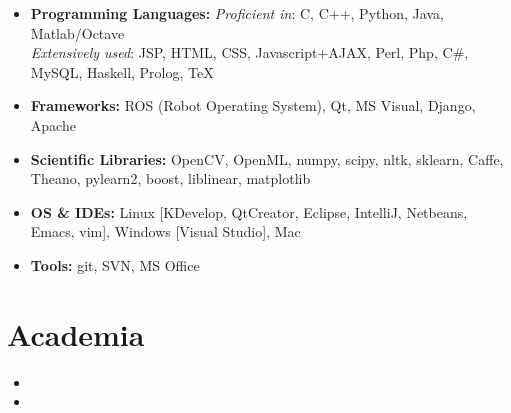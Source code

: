 \documentclass[10pt,letterpaper,sans]{moderncv}        %
\begin{document}
\vspace{2pt}

\begin{itemize}

\item \textbf{Programming Languages:} \emph{Proficient in}: C, C++, Python, Java, Matlab/Octave \\ \emph{Extensively used}: JSP, HTML, CSS, Javascript+AJAX, Perl, Php, C\#, MySQL, Haskell, Prolog, TeX

\item \textbf{Frameworks:} ROS (Robot Operating System), Qt, MS Visual, Django, Apache

\item \textbf{Scientific Libraries:} OpenCV, OpenML, numpy, scipy, nltk, sklearn, Caffe, Theano, pylearn2, boost, liblinear, matplotlib

\item \textbf{OS \& IDEs:} Linux [KDevelop, QtCreator, Eclipse, IntelliJ, Netbeans, Emacs, vim], Windows [Visual Studio], Mac

\item \textbf{Tools:} git, SVN, MS Office

\end{itemize}

\section{Academia}

\vspace{5pt}

\begin{itemize}

\item{}

\item{}  %

\end{itemize}
\vspace{2pt}
\end{document}
